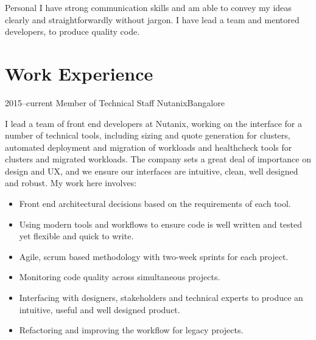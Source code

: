 \documentclass[11pt,a4paper,sans]{moderncv}        %
\begin{document}
\cvline
{\textcolor{light}{Personal}}
{I have strong communication skills and am able to convey my ideas clearly and straightforwardly without jargon. I have lead a team and mentored developers, to produce quality code.}

\vspace{6pt}

\vspace{6pt}

\section{Work Experience}

\vspace{6pt}

\cventry
{\textcolor{light}{2015--current}}
{Member of Technical Staff}
{}
{Nutanix}{Bangalore}
{I lead a team of front end developers at Nutanix, working on the interface for a number of technical tools, including sizing and quote generation for clusters, automated deployment and migration of workloads and healthcheck tools for clusters and migrated workloads. The company sets a great deal of importance on design and UX, and we ensure our interfaces are intuitive, clean, well designed and robust. My work here involves:
\vspace{6pt}
\begin{itemize}
  \item Front end architectural decisions based on the requirements of each tool.
  \item Using modern tools and workflows to ensure code is well written and tested yet flexible and quick to write.
  \item Agile, scrum based methodology with two-week sprints for each project.
  \item Monitoring code quality across simultaneous projects.
  \item Interfacing with designers, stakeholders and technical experts to produce an intuitive, useful and well designed product.
  \item Refactoring and improving the workflow for legacy projects.
\end{itemize}}

\vspace{8pt}
\end{document}
